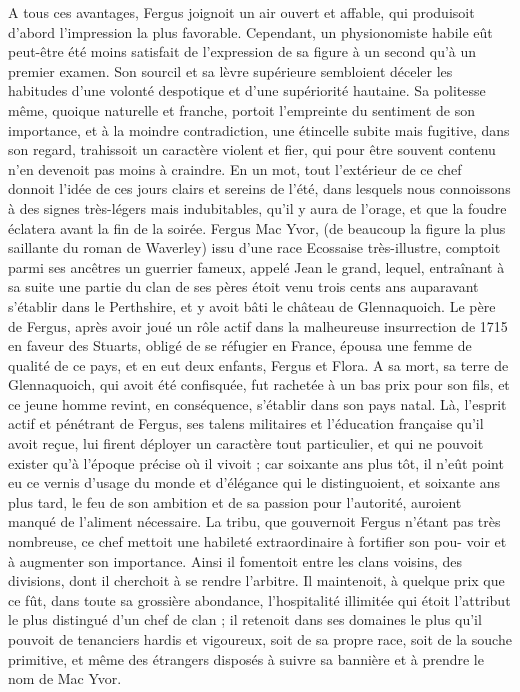 A tous ces avantages, Fergus joignoit un air ouvert et affable, qui produisoit d'abord l'impression la plus favorable. Cependant, un physionomiste habile eût peut-être été moins satisfait de l'expression de sa figure à un second qu'à un premier examen. Son sourcil et sa lèvre supérieure sembloient déceler les habitudes d'une volonté despotique et d'une supériorité hautaine. Sa politesse même, quoique naturelle et franche, portoit l'empreinte du sentiment de son importance, et à la moindre contradiction, une étincelle subite mais fugitive, dans son regard, trahissoit un caractère violent et fier, qui pour être souvent contenu n'en devenoit pas moins à craindre. En un mot, tout l'extérieur de ce chef donnoit l'idée de ces jours clairs et sereins de l'été, dans lesquels nous connoissons à des signes très-légers mais indubitables, qu'il y aura de l'orage, et que la foudre éclatera avant la fin de la soirée.
Fergus Mac Yvor, (de beaucoup la figure la plus saillante du roman de Waverley) issu d'une race Ecossaise très-illustre, comptoit parmi ses ancêtres un guerrier fameux,\setcounter{page}{115} appelé Jean le grand, lequel, entraînant à sa suite une partie du clan de ses pères étoit venu trois cents ans auparavant s'établir dans le Perthshire, et y avoit bâti le château de Glennaquoich. Le père de Fergus, après avoir joué un rôle actif dans la malheureuse insurrection de 1715 en faveur des Stuarts, obligé de se réfugier en France, épousa une femme de qualité de ce pays, et en eut deux enfants, Fergus et Flora. A sa mort, sa terre de Glennaquoich, qui avoit été confisquée, fut rachetée à un bas prix pour son fils, et ce jeune homme revint, en conséquence, s'établir dans son pays natal. Là, l'esprit actif et pénétrant de Fergus, ses talens militaires et l'éducation française qu'il avoit reçue, lui firent déployer un caractère tout particulier, et qui ne pouvoit exister qu'à l'époque précise où il vivoit ; car soixante ans plus tôt, il n'eût point eu ce vernis d'usage du monde et d'élégance qui le distinguoient, et soixante ans plus tard, le feu de son ambition et de sa passion pour l'autorité, auroient manqué de l'aliment nécessaire.
La tribu, que gouvernoit Fergus n'étant pas très nombreuse, ce chef mettoit une habileté extraordinaire à fortifier son pou-\setcounter{page}{116} voir et à augmenter son importance. Ainsi il fomentoit entre les clans voisins, des divisions, dont il cherchoit à se rendre l'arbitre. Il maintenoit, à quelque prix que ce fût, dans toute sa grossière abondance, l'hospitalité illimitée qui étoit l'attribut le plus distingué d'un chef de clan ; il retenoit dans ses domaines le plus qu'il pouvoit de tenanciers hardis et vigoureux, soit de sa propre race, soit de la souche primitive, et même des étrangers disposés à suivre sa bannière et à prendre le nom de Mac Yvor.
